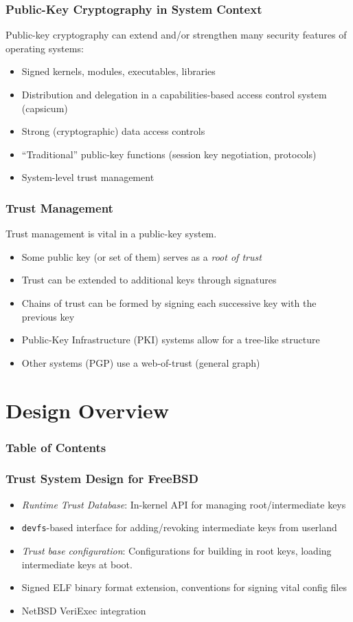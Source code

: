 \documentclass{beamer}
\begin{document}
\begin{frame}
  \frametitle{Public-Key Cryptography in System Context}

  Public-key cryptography can extend and/or strengthen many security
  features of operating systems:
  \begin{itemize}
  \item Signed kernels, modules, executables, libraries
  \item Distribution and delegation in a capabilities-based access
    control system (capsicum)
  \item Strong (cryptographic) data access controls
  \item ``Traditional'' public-key functions (session key negotiation,
    protocols)
  \item System-level trust management
  \end{itemize}
\end{frame}

\begin{frame}
  \frametitle{Trust Management}

  Trust management is vital in a public-key system.
  \begin{itemize}
  \item Some public key (or set of them) serves as a \emph{root of trust}
  \item Trust can be extended to additional keys through signatures
  \item Chains of trust can be formed by signing each successive key
    with the previous key
  \item Public-Key Infrastructure (PKI) systems allow for a tree-like
    structure
  \item Other systems (PGP) use a web-of-trust (general graph)
  \end{itemize}
\end{frame}

\section{Design Overview}

\begin{frame}
  \frametitle{Table of Contents}
  \tableofcontents[currentsection]
\end{frame}

\begin{frame}
  \frametitle{Trust System Design for FreeBSD}
  \begin{itemize}
  \item \emph{Runtime Trust Database}: In-kernel API for managing
    root/intermediate keys
  \item \texttt{devfs}-based interface for adding/revoking
    intermediate keys from userland
  \item \emph{Trust base configuration}: Configurations for building
    in root keys, loading intermediate keys at boot.
  \item Signed ELF binary format extension, conventions for signing
    vital config files
  \item NetBSD VeriExec integration
  \end{itemize}
\end{frame}
\end{document}
